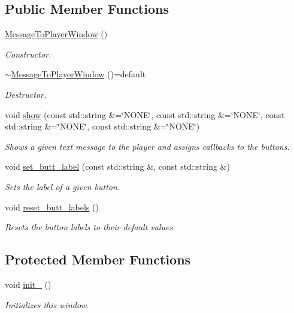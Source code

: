 \subsection*{Public Member Functions}
\begin{DoxyCompactItemize}
\item 
\hyperlink{class_message_to_player_window_a1522c842309df689cf032d9b3de76fa7}{Message\+To\+Player\+Window} ()
\begin{DoxyCompactList}\small\item\em Constructor. \end{DoxyCompactList}\item 
\hyperlink{class_message_to_player_window_a09180c464e2bdafec3657d4dd3692d99}{$\sim$\+Message\+To\+Player\+Window} ()=default
\begin{DoxyCompactList}\small\item\em Destructor. \end{DoxyCompactList}\item 
void \hyperlink{class_message_to_player_window_aa61b87c640a95dbaafe796392522b0b9}{show} (const std\+::string \&=\char`\"{}N\+O\+NE\char`\"{}, const std\+::string \&=\char`\"{}N\+O\+NE\char`\"{}, const std\+::string \&=\char`\"{}N\+O\+NE\char`\"{}, const std\+::string \&=\char`\"{}N\+O\+NE\char`\"{})
\begin{DoxyCompactList}\small\item\em Shows a given text message to the player and assigns callbacks to the buttons. \end{DoxyCompactList}\item 
void \hyperlink{class_message_to_player_window_aaa52044d01c842b03df4e83b58be4098}{set\+\_\+butt\+\_\+label} (const std\+::string \&, const std\+::string \&)
\begin{DoxyCompactList}\small\item\em Sets the label of a given button. \end{DoxyCompactList}\item 
void \hyperlink{class_message_to_player_window_af0c2aad5fd5b2d502641a1249dcfe650}{reset\+\_\+butt\+\_\+labels} ()
\begin{DoxyCompactList}\small\item\em Resets the button labels to their default values. \end{DoxyCompactList}\end{DoxyCompactItemize}
\subsection*{Protected Member Functions}
\begin{DoxyCompactItemize}
\item 
void \hyperlink{class_message_to_player_window_a5eb87ad777baa5c23a3cdb262512d9e3}{init\+\_\+} ()
\begin{DoxyCompactList}\small\item\em Initializes this window. \end{DoxyCompactList}\end{DoxyCompactItemize}
